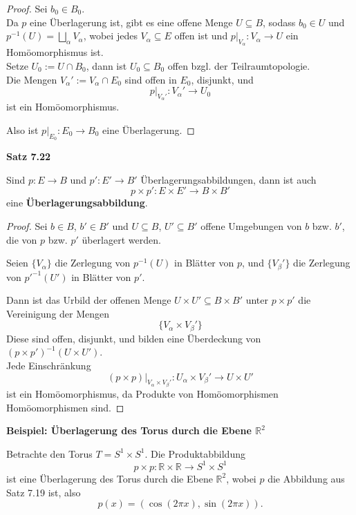 \documentclass[fleqn, 12pt, letterpaper]{article}
\begin{document}
\begin{proof}
Sei \( b_0 \in B_0 \). \\
Da \( p \) eine Überlagerung ist, gibt es eine offene Menge \( U \subseteq B \), sodass \( b_0 \in U \) und \( p^{-1}(U) = \bigsqcup_\alpha V_\alpha \), wobei jedes \( V_\alpha \subseteq E \) offen ist und \( p|_{V_\alpha} : V_\alpha \to U \) ein Homöomorphismus ist.\\

Setze \( U_0 := U \cap B_0 \), dann ist \( U_0 \subseteq B_0 \) offen bzgl. der Teilraumtopologie.\\

Die Mengen \( V_\alpha' := V_\alpha \cap E_0 \) sind offen in \( E_0 \), disjunkt, und
\[
p|_{V_\alpha'} : V_\alpha' \to U_0
\]
ist ein Homöomorphismus.

Also ist \( p|_{E_0} : E_0 \to B_0 \) eine Überlagerung.
\end{proof}

\textbf{Satz 7.22}

Sind \( p : E \to B \) und \( p' : E' \to B' \) Überlagerungsabbildungen, dann ist auch
\[
p \times p' : E \times E' \to B \times B'
\]
eine \textbf{Überlagerungsabbildung}.

\begin{proof}
    

Sei \( b \in B \), \( b' \in B' \) und \( U \subseteq B \), \( U' \subseteq B' \) offene Umgebungen von \( b \) bzw. \( b' \), die von \( p \) bzw. \( p' \) überlagert werden.

Seien \( \{ V_\alpha \} \) die Zerlegung von \( p^{-1}(U) \) in Blätter von \( p \), und \( \{ V_\beta' \} \) die Zerlegung von \( {p'}^{-1}(U') \) in Blätter von \( p' \).

Dann ist das Urbild der offenen Menge \( U \times U' \subseteq B \times B' \) unter \( p \times p' \) die Vereinigung der Mengen
\[
\{V_\alpha \times V_\beta'\}
\]
Diese sind offen, disjunkt, und bilden eine Überdeckung von \( (p \times p')^{-1}(U \times U') \). \\
Jede Einschränkung
\[
(p \times p)|_{V_\alpha \times V_\beta'} : U_\alpha \times V_\beta' \to U \times U'
\]
ist ein Homöomorphismus, da Produkte von Homöomorphismen Homöomorphismen sind.
\end{proof}

\textbf{Beispiel: Überlagerung des Torus durch die Ebene \(\mathbb{R}^2\)}

Betrachte den Torus \( T = S^1 \times S^1 \). Die Produktabbildung
\[
p \times p : \mathbb{R} \times \mathbb{R} \longrightarrow S^1 \times S^1
\]
ist eine {Überlagerung des Torus} durch die Ebene \( \mathbb{R}^2 \), wobei \( p \) die Abbildung aus Satz 7.19 ist, also
\[
p(x) = (\cos(2\pi x), \sin(2\pi x)).
\]
\end{document}
